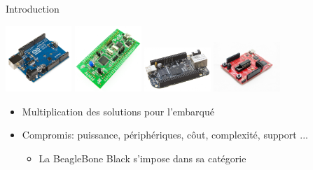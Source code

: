 \documentclass{beamer}
\begin{document}
\begin{frame}{Introduction}

  \begin{center}
    \includegraphics[width=25mm]{pic/arduino.jpg}
    \includegraphics[width=25mm]{pic/stm32.png}
    \includegraphics[width=25mm]{pic/bbb.jpg}
    \includegraphics[width=25mm]{pic/msp430.jpg}
  \end{center}

  \begin{small}
    \begin{itemize}
    \item Multiplication des solutions pour l'embarqu\'{e}
    \item Compromis: puissance, p\'{e}riph\'{e}riques, c\^out, complexit\'{e}, support ...
      \begin{itemize}
      \item[\checkmark] La BeagleBone Black s'impose dans sa cat\'egorie
      \end{itemize}
    \end{itemize}
  \end{small}

\end{frame}
\end{document}
